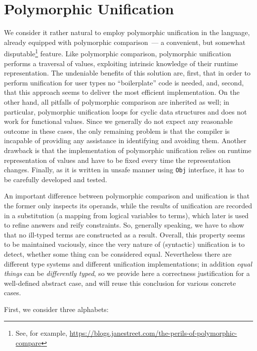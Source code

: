 \section{Polymorphic Unification}
\label{sec:unification}

We consider it rather natural to employ polymorphic unification in the language, already equipped 
with polymorphic comparison~--- a convenient, but somewhat disputable\footnote{See, for example, 
\url{https://blogs.janestreet.com/the-perils-of-polymorphic-compare}} feature. Like polymorphic comparison, 
polymorphic unification performs a traversal of values, exploiting intrinsic knowledge of their runtime 
representation. The undeniable benefits of this solution are, first, that in order to perform unification 
for user types no ``boilerplate'' code is needed, and, second, that this approach seems to deliver the
most efficient implementation. On the other hand, all pitfalls of polymorphic comparison are inherited as 
well; in particular, polymorphic unification loops for cyclic data structures and does not work for functional 
values. Since we generally do not expect any reasonable outcome in these cases, the only remaining problem is that
the compiler is incapable of providing any assistance in identifying and avoiding them. Another drawback is that 
the implementation of polymorphic unification relies on runtime representation of values and have to be fixed 
every time the representation changes.  Finally, as it is written in unsafe manner using \lstinline{Obj} interface, 
it has to be carefully developed and tested.

An important difference between polymorphic comparison and unification is that the former only inspects its operands, 
while the results of unification are recorded in a substitution (a mapping from logical variables to terms), which 
later is used to refine answers and reify constraints. So, generally speaking, we have to show that no ill-typed 
terms are constructed as a result. Overall, this property seems to be maintained vaciously, since the very 
nature of (syntactic) unification is to detect, whether some thing can be considered equal. Nevertheless there are
different type systems and different unification implementations; in addition \emph{equal things} can be
\emph{differently typed}, so we provide here a correctness justification for a well-defined abstract case, and will 
reuse this conclusion for various concrete cases.

First, we consider three alphabets:

